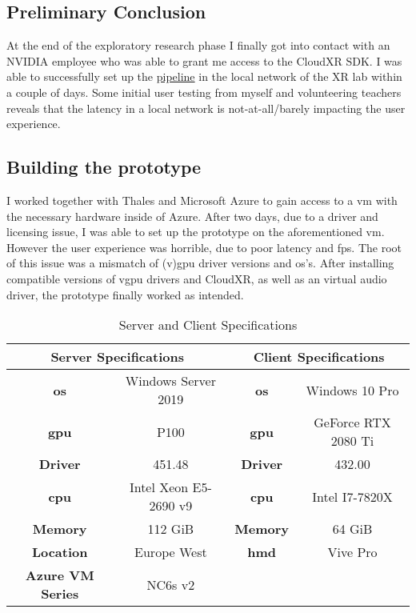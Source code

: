 \subsection{Preliminary Conclusion}
At the end of the exploratory research phase I finally got into contact with an NVIDIA employee who was able to grant me access to the CloudXR SDK. I was able to successfully set up the \hyperref[fig:pr0]{pipeline} in the local network of the XR lab within a couple of days. Some initial user testing from myself and volunteering teachers reveals that the latency in a local network is not-at-all/barely impacting the user experience.

\subsection{Building the prototype}
I worked together with Thales and Microsoft Azure to gain access to a \acrfull{vm} with the necessary hardware inside of Azure. After two days, due to a driver and licensing issue, I was able to set up the prototype on the aforementioned \acrshort{vm}. However the user experience was horrible, due to poor latency and \acrshort{fps}. The root of this issue was a mismatch of (v)\acrshort{gpu} driver versions and \acrfull{os}'s. After installing compatible versions of v\acrshort{gpu} drivers and CloudXR, as well as an virtual audio driver, the prototype finally worked as intended.

\begin{table}[h]	
\begin{center}
\begin{tabular}{ |c|c|c|c| } 
\hline
\multicolumn{2}{|c|}{Server Specifications} & \multicolumn{2}{|c|}{Client Specifications}\\ 
\hline\hline
\textbf{\acrshort{os}} & Windows Server 2019  &  \textbf{\acrshort{os}} & Windows 10 Pro\\ 
\hline
\textbf{\acrshort{gpu}} & P100 & \textbf{\acrshort{gpu}} & GeForce RTX 2080 Ti\\ 
\hline
\textbf{Driver} & 451.48 &  \textbf{Driver} & 432.00\\ 
\hline
\textbf{\acrshort{cpu}} & Intel Xeon E5-2690 v9 & \textbf{\acrshort{cpu}} & Intel I7-7820X\\
\hline
\textbf{Memory} & 112 GiB & \textbf{Memory} & 64 GiB\\
\hline
\textbf{Location} & Europe West & \textbf{\acrshort{hmd}} & Vive Pro\\
\hline
\textbf{Azure VM Series} & NC6s v2 & & \\
\hline
\end{tabular}
\end{center}
\caption{Server and Client Specifications}
\end{table}

